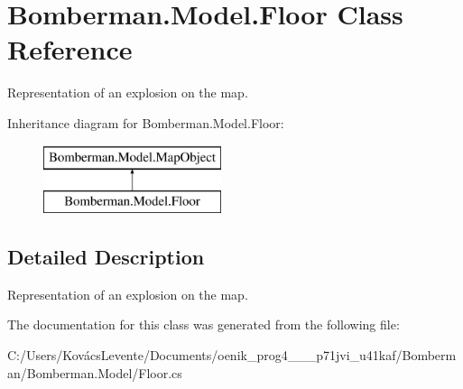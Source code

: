 \hypertarget{class_bomberman_1_1_model_1_1_floor}{}\section{Bomberman.\+Model.\+Floor Class Reference}
\label{class_bomberman_1_1_model_1_1_floor}


Representation of an explosion on the map.  


Inheritance diagram for Bomberman.\+Model.\+Floor\+:\begin{figure}[H]
\begin{center}
\leavevmode
\includegraphics[height=2.000000cm]{class_bomberman_1_1_model_1_1_floor}
\end{center}
\end{figure}


\subsection{Detailed Description}
Representation of an explosion on the map. 



The documentation for this class was generated from the following file\+:\begin{DoxyCompactItemize}
\item 
C\+:/\+Users/\+Kovács\+Levente/\+Documents/oenik\+\_\+prog4\+\_\+\_\+\_\+p71jvi\+\_\+u41kaf/\+Bomberman/\+Bomberman.\+Model/Floor.\+cs\end{DoxyCompactItemize}
